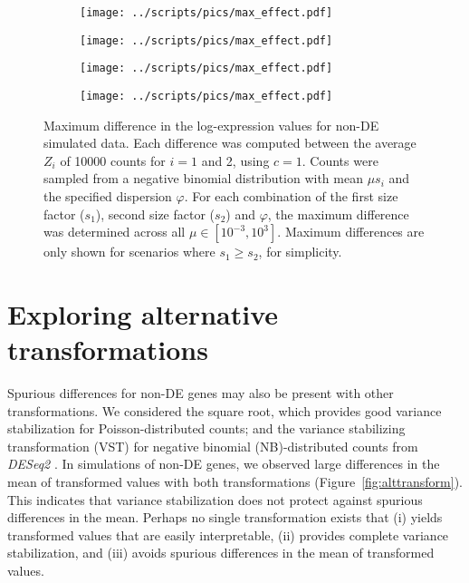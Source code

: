 \documentclass[10pt,letterpaper]{article}
\begin{document}
\begin{figure}[btp]
\centering
\begin{subfigure}[b]{0.49\textwidth}
    \texttt{[image: ../scripts/pics/max\_effect.pdf]}
    \caption{}
\end{subfigure}
\begin{subfigure}[b]{0.49\textwidth}
    \texttt{[image: ../scripts/pics/max\_effect.pdf]}
    \caption{}
\end{subfigure}
\begin{subfigure}[b]{0.49\textwidth}
    \texttt{[image: ../scripts/pics/max\_effect.pdf]}
    \caption{}
\end{subfigure}
\begin{subfigure}[b]{0.49\textwidth}
    \texttt{[image: ../scripts/pics/max\_effect.pdf]}
    \caption{}
\end{subfigure}
\caption{Maximum difference in the log-expression values for non-DE simulated data.
Each difference was computed between the average $Z_i$ of 10000 counts for $i=1$ and 2, using $c=1$.
Counts were sampled from a negative binomial distribution with mean $\mu s_i$ and the specified dispersion $\varphi$.
For each combination of the first size factor ($s_1$), second size factor ($s_2$) and $\varphi$, the maximum difference was determined across all $\mu \in [10^{-3}, 10^3]$.
Maximum differences are only shown for scenarios where $s_1 \ge s_2$, for simplicity.
}
\label{fig:maxeffect}
\end{figure}

\section{Exploring alternative transformations}
Spurious differences for non-DE genes may also be present with other transformations.
We considered the square root, which provides good variance stabilization for Poisson-distributed counts;
and the variance stabilizing transformation (VST) for negative binomial (NB)-distributed counts from \emph{DESeq2} \cite{love2014moderated}.
In simulations of non-DE genes, we observed large differences in the mean of transformed values with both transformations (Figure~\ref{fig:alttransform}).
This indicates that variance stabilization does not protect against spurious differences in the mean.
Perhaps no single transformation exists that 
(i) yields transformed values that are easily interpretable,
(ii) provides complete variance stabilization, and
(iii) avoids spurious differences in the mean of transformed values.
\end{document}
